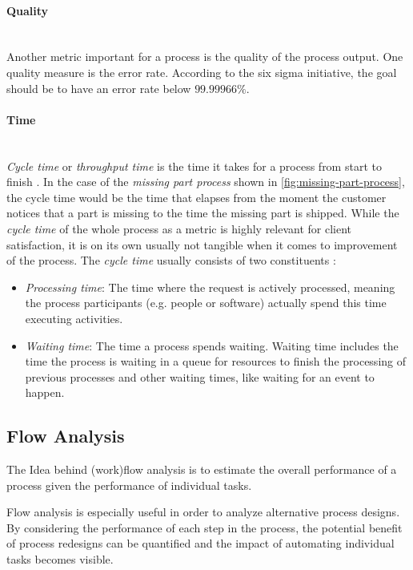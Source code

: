 \paragraph{Quality}~\\
Another metric important for a process is the quality of the process output. One quality measure is the error rate. According to the six sigma initiative, the goal should be to have an error rate below $99.99966\%$.

\paragraph{Time}~\\
\textit{Cycle time} or \textit{throughput time} is the time it takes for a process from start to finish \cite{Six-sigma-terms}. In the case of the \textit{missing part process} shown in \ref{fig:missing-part-process}, the cycle time would be the time that elapses from the moment the customer notices that a part is missing to the time the missing part is shipped. While the \textit{cycle time} of the whole process as a metric is highly relevant for client satisfaction, it is on its own usually not tangible when it comes to improvement of the process. The \textit{cycle time} usually consists of two constituents \cite{fundamentals}:
\begin{itemize}
	\item \textit{Processing time}: The time where the request is actively processed, meaning the process participants (e.g. people or software) actually spend this time executing activities. 
	\item \textit{Waiting time}: The time a process spends waiting. Waiting time includes the time the process is waiting in a queue for resources to finish the processing of previous processes and other waiting times, like waiting for an event to happen.
\end{itemize}

\subsection{Flow Analysis}
The Idea behind (work)flow analysis is to estimate the overall performance of a process given the performance of individual tasks.  

Flow analysis is especially useful in order to analyze alternative process designs. By considering the performance of each step in the process, the potential benefit of process redesigns can be quantified and the impact of automating individual tasks becomes visible.

